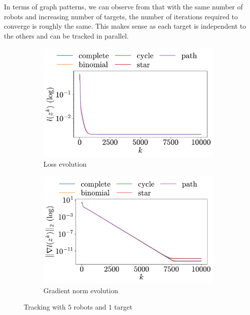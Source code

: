 \documentclass[a4paper,11pt,oneside]{book}
\begin{document}
In terms of graph patterns, we can observe from  that with the same number of robots and increasing number of targets, the number of iterations required to converge is roughly the same. This makes sense as each target is independent to the others and can be tracked in parallel.

\begin{figure}[h!]
      \centering
      \begin{subfigure}[h]{0.4\linewidth}
            \centering
            \includegraphics[width=\linewidth]{./figs/tracking/5_1_2/loss.pdf} 
            \caption{Loss evolution}
      \end{subfigure}
      \hfill
      \begin{subfigure}[h]{0.4\linewidth}
            \centering
            \includegraphics[width=\linewidth]{./figs/tracking/5_1_2/gradient.pdf} 
            \caption{Gradient norm evolution}
      \end{subfigure}
      \caption{Tracking with $5$ robots and $1$ target}
      \label{fig:tracking_5_1}
\end{figure}
\end{document}
